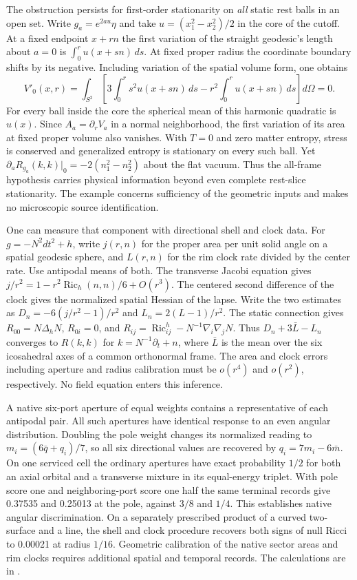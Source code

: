 \documentclass[11pt]{article}
\begin{document}
The obstruction persists for first-order stationarity on \emph{all}
static rest balls in an open set. Write \(g_a=e^{2au}\eta\) and take
\(u=(x_1^2-x_2^2)/2\) in the core of the cutoff. At a fixed endpoint
\(x+rn\) the first variation of the straight geodesic's length about
\(a=0\) is \(\int_0^r u(x+sn)\,ds\). At fixed proper radius the
coordinate boundary shifts by its negative. Including variation of the
spatial volume form, one obtains
\[
 V'_0(x,r)=\int_{S^2}\left[3\int_0^r s^2u(x+sn)\,ds
    -r^2\int_0^r u(x+sn)\,ds\right]d\Omega=0 .
\]
For every ball inside the core the spherical mean of this harmonic
quadratic is \(u(x)\). Since \(A_a=\partial_r V_a\) in a normal
neighborhood, the first variation of its area at fixed proper volume
also vanishes. With \(T=0\) and zero matter entropy, stress is
conserved and generalized entropy is stationary on every such ball.
Yet \(\partial_a R_{g_a}(k,k)|_0=-2(n_1^2-n_2^2)\) about the flat vacuum.
Thus the all-frame hypothesis carries physical information beyond even
complete rest-slice stationarity. The example concerns sufficiency of
the geometric inputs and makes no microscopic source identification.

One can measure that component with directional shell and clock data.
For \(g=-N^2dt^2+h\), write \(j(r,n)\) for the proper area per unit
solid angle on a spatial geodesic sphere, and \(L(r,n)\) for the rim
clock rate divided by the center rate. Use antipodal means of both.
The transverse Jacobi equation gives
\(j/r^2=1-r^2\operatorname{Ric}_h(n,n)/6+O(r^3)\).
The centered second difference of the clock gives the normalized
spatial Hessian of the lapse. Write the two estimates as
\(D_n=-6(j/r^2-1)/r^2\) and \(L_n=2(L-1)/r^2\).
The static connection gives \(R_{00}=N\Delta_hN\),
\(R_{0i}=0\), and
\(R_{ij}=\operatorname{Ric}^h_{ij}-N^{-1}\nabla_i\nabla_jN\).
Thus \(D_n+3\bar L-L_n\) converges to \(R(k,k)\) for
\(k=N^{-1}\partial_t+n\), where \(\bar L\) is the mean over the six
icosahedral axes of a common orthonormal frame. The area and clock
errors including aperture and radius calibration must be \(o(r^4)\)
and \(o(r^2)\), respectively. No field equation enters this inference.

A native six-port aperture of equal weights contains a representative
of each antipodal pair. All such apertures have identical response to
an even angular distribution. Doubling the pole weight changes its
normalized reading to \(m_i=(6\bar q+q_i)/7\), so all six directional
values are recovered by \(q_i=7m_i-6\bar m\). On one serviced cell
the ordinary apertures have exact probability \(1/2\) for both an axial
orbital and a transverse mixture in its equal-energy triplet.
With pole score one and neighboring-port score one half the same
terminal records give 0.37535 and 0.25013 at the pole, against
\(3/8\) and \(1/4\). This establishes native angular discrimination.
On a separately prescribed product of a curved two-surface and a line,
the shell and clock procedure recovers both signs of null Ricci to
0.00021 at radius \(1/16\). Geometric calibration of the native sector
areas and rim clocks requires additional spatial and temporal records.
The calculations are in .
\end{document}
